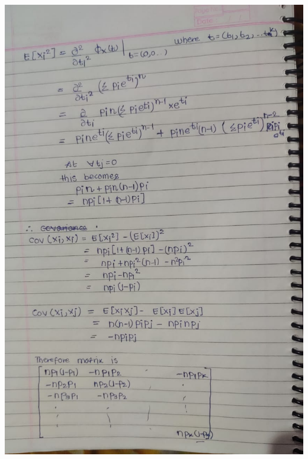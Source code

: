 \documentclass{article}
\theoremstyle{remark}
\begin{document}
\includegraphics[width=\textwidth, height=\textheight, keepaspectratio]{7b.jpeg}\par
\end{document}
